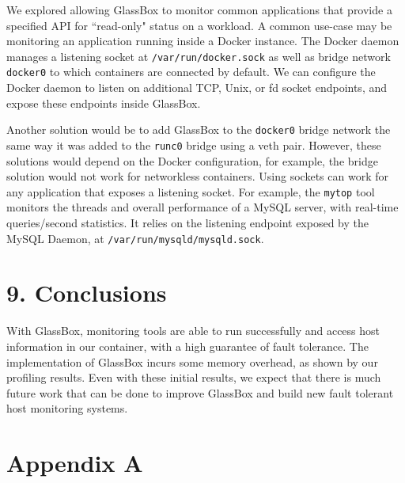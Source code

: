 \documentclass{proc}
\begin{document}
We explored allowing GlassBox to monitor common applications that provide a specified API for ``read-only" status on a workload. A common use-case may be monitoring an application running inside a Docker instance. The Docker daemon manages a listening socket at \texttt{/var/run/docker.sock} as well as bridge network \texttt{docker0} to which containers are connected by default. We can configure the Docker daemon to listen on additional TCP, Unix, or fd socket endpoints, and expose these endpoints inside GlassBox.

Another solution would be to add GlassBox to the \texttt{docker0} bridge network the same way it was added to the \texttt{runc0} bridge using a veth pair. However, these solutions would depend on the Docker configuration, for example, the bridge solution would not work for networkless containers. Using sockets can work for any application that exposes a listening socket. For example, the \texttt{mytop} tool monitors the threads and overall performance of a MySQL server, with real-time queries/second statistics. It relies on the listening endpoint exposed by the MySQL Daemon, at \texttt{/var/run/mysqld/mysqld.sock}.

\section*{9. Conclusions}

With GlassBox, monitoring tools are able to run successfully and access host information in our container, with a high guarantee of fault tolerance. The implementation of GlassBox incurs some memory overhead, as shown by our profiling results. Even with these initial results, we expect that there is much future work that can be done to improve GlassBox and build new fault tolerant host monitoring systems.




\clearpage

\section*{Appendix A}

\clearpage
\end{document}
